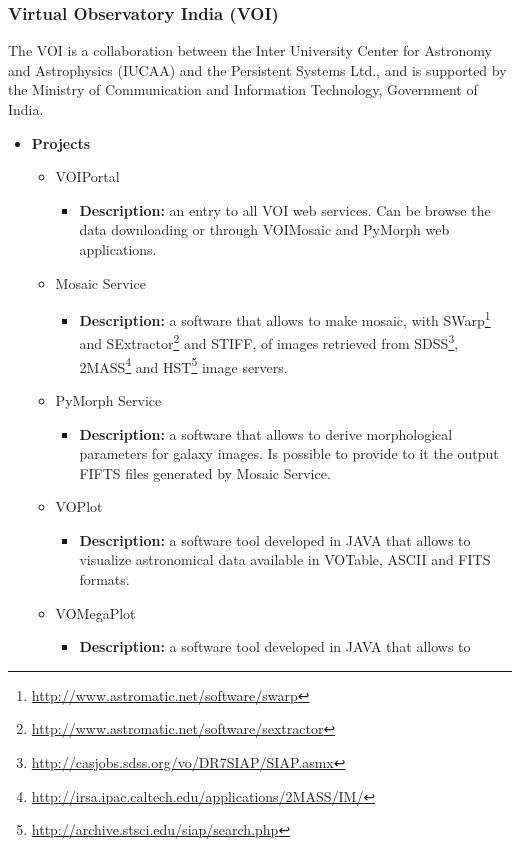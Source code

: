 \subsubsection{Virtual Observatory India (VOI)}
The VOI is a collaboration between the Inter University Center for Astronomy and
Astrophysics (IUCAA) and the Persistent Systems Ltd., and is supported by the
Ministry of Communication and Information Technology, Government of India.

\begin{itemize}
\item \textbf{Projects}
\begin{itemize}
\item VOIPortal
\begin{itemize}
\item \textbf{Description:} an entry to all VOI web services. Can be browse the
data downloading or through VOIMosaic and PyMorph web applications.
\end{itemize}
\item Mosaic Service
\begin{itemize}
\item \textbf{Description:} a software that allows to make mosaic, with
SWarp\footnote{\url{http://www.astromatic.net/software/swarp}} and
SExtractor\footnote{\url{http://www.astromatic.net/software/sextractor}} and
STIFF, of images retrieved from
SDSS\footnote{\url{http://casjobs.sdss.org/vo/DR7SIAP/SIAP.asmx}},
2MASS\footnote{\url{http://irsa.ipac.caltech.edu/applications/2MASS/IM/}} and
HST\footnote{\url{http://archive.stsci.edu/siap/search.php}} image servers.
\end{itemize}
\item PyMorph Service
\begin{itemize}
\item \textbf{Description:} a software that allows to derive morphological
parameters for galaxy images. Is possible to provide to it the output FIFTS
files generated by Mosaic Service.
\end{itemize}
\item VOPlot
\begin{itemize}
\item \textbf{Description:} a software tool developed in JAVA that allows to
visualize astronomical data available in VOTable, ASCII and FITS formats.
\end{itemize}
\item VOMegaPlot
\begin{itemize}
\item \textbf{Description:} a software tool developed in JAVA that allows to

\end{itemize}
\end{itemize}
\end{itemize}
